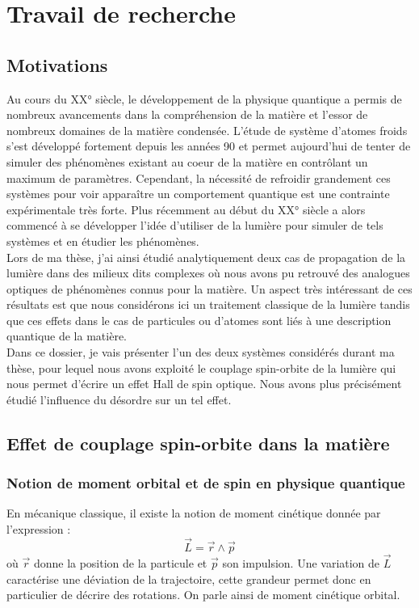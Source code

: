 \documentclass[a4paper,11pt]{article} %
\begin{document}
	
	\section{Travail de recherche}
	\subsection{Motivations}
	Au cours du XX° siècle, le développement de la physique quantique a permis de nombreux avancements dans la compréhension de la matière et l'essor de nombreux domaines de la matière condensée. L'étude de système d'atomes froids s'est développé fortement depuis les années 90 et permet aujourd'hui de tenter de simuler des phénomènes existant au coeur de la matière en contrôlant un maximum de paramètres. Cependant, la nécessité de refroidir grandement ces systèmes pour voir apparaître un comportement quantique est une contrainte expérimentale très forte. Plus récemment au début du XX° siècle a alors commencé à se développer l'idée d'utiliser de la lumière pour simuler de tels systèmes et en étudier les phénomènes.\\
	
	Lors de ma thèse, j'ai ainsi étudié analytiquement deux cas de propagation de la lumière dans des milieux dits complexes où nous avons pu retrouvé des analogues optiques de phénomènes connus pour la matière. Un aspect très intéressant de ces résultats est que nous considérons ici un traitement classique de la lumière tandis que ces effets dans le cas de particules ou d'atomes sont liés à une description quantique de la matière.\\
	
	Dans ce dossier, je vais présenter l'un des deux systèmes considérés durant ma thèse, pour lequel nous avons exploité le couplage spin-orbite de la lumière qui nous permet d'écrire un effet Hall de spin optique. Nous avons plus précisément étudié l'influence du désordre sur un tel effet.
	
	\subsection{Effet de couplage spin-orbite dans la matière}
	\subsubsection{Notion de moment orbital et de spin en physique quantique}
	En mécanique classique, il existe la notion de moment cinétique donnée par l'expression :
	\begin{equation*}
		\vec{L} = \vec{r} \wedge \vec{p}
	\end{equation*}
	où $\vec{r}$ donne la position de la particule et $\vec{p}$ son impulsion. Une variation de $\vec{L}$ caractérise une déviation de la trajectoire, cette grandeur permet donc en particulier de décrire des rotations. On parle ainsi de moment cinétique orbital.\\
	
\end{document}
